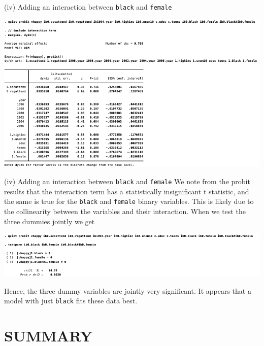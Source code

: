 \documentclass[
  10pt,
  ignorenonframetext,
]{beamer}
\begin{document}
\begin{frame}{(iv) Adding an interaction between \texttt{black} and
\texttt{female}}
\protect\hypertarget{iv-adding-an-interaction-between-black-and-female}{}
\begin{center}\includegraphics[width=1\linewidth]{pictures/ex2-PROBIT-APE-add7ctrls} \end{center}
\end{frame}

\begin{frame}[fragile]{(iv) Adding an interaction between \texttt{black}
and \texttt{female}}
\protect\hypertarget{iv-adding-an-interaction-between-black-and-female-1}{}
We note from the probit results that the interaction term has a
statistically insignificant t statistic, and the same is true for the
\texttt{black} and \texttt{female} binary variables. This is likely due
to the collinearity between the variables and their interaction. When we
test the three dummies jointly we get

\begin{center}\includegraphics[width=0.9\linewidth]{pictures/ex2-PROBIT-APE-add7ctrls-test} \end{center}

Hence, the three dummy variables are jointly very significant. It
appears that a model with just \texttt{black} fits these data best.
\end{frame}

\hypertarget{summary}{%
\section{SUMMARY}\label{summary}}
\end{document}
